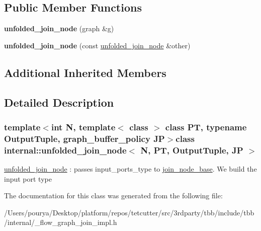\subsection*{Public Member Functions}
\begin{DoxyCompactItemize}
\item 
\hypertarget{classinternal_1_1unfolded__join__node_a7c2a5d172b4d93dfe73a91f501de428f}{}{\bfseries unfolded\+\_\+join\+\_\+node} (graph \&g)\label{classinternal_1_1unfolded__join__node_a7c2a5d172b4d93dfe73a91f501de428f}

\item 
\hypertarget{classinternal_1_1unfolded__join__node_a237f9f8304a5784bb0eaf8236ebe6c11}{}{\bfseries unfolded\+\_\+join\+\_\+node} (const \hyperlink{classinternal_1_1unfolded__join__node}{unfolded\+\_\+join\+\_\+node} \&other)\label{classinternal_1_1unfolded__join__node_a237f9f8304a5784bb0eaf8236ebe6c11}

\end{DoxyCompactItemize}
\subsection*{Additional Inherited Members}


\subsection{Detailed Description}
\subsubsection*{template$<$int N, template$<$ class $>$ class P\+T, typename Output\+Tuple, graph\+\_\+buffer\+\_\+policy J\+P$>$class internal\+::unfolded\+\_\+join\+\_\+node$<$ N, P\+T, Output\+Tuple, J\+P $>$}

\hyperlink{classinternal_1_1unfolded__join__node}{unfolded\+\_\+join\+\_\+node} \+: passes input\+\_\+ports\+\_\+type to \hyperlink{classinternal_1_1join__node__base}{join\+\_\+node\+\_\+base}. We build the input port type 

The documentation for this class was generated from the following file\+:\begin{DoxyCompactItemize}
\item 
/\+Users/pourya/\+Desktop/platform/repos/tetcutter/src/3rdparty/tbb/include/tbb/internal/\+\_\+flow\+\_\+graph\+\_\+join\+\_\+impl.\+h\end{DoxyCompactItemize}
